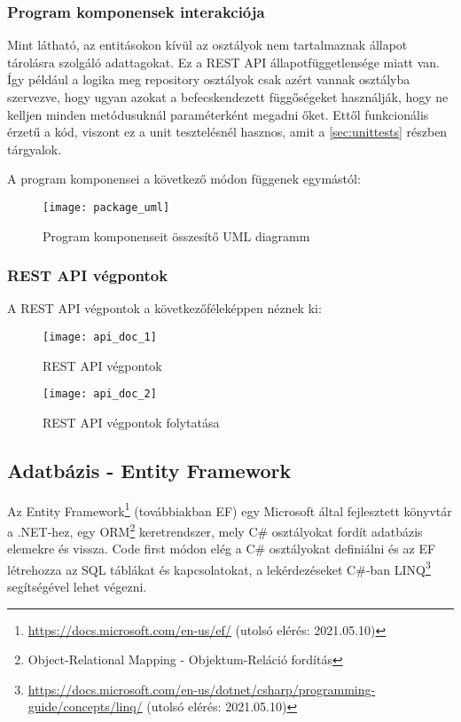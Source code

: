 \clearpage

\subsubsection{Program komponensek interakciója}

Mint látható, az entitásokon kívül az osztályok nem tartalmaznak állapot tárolásra szolgáló adattagokat. Ez a REST API állapotfüggetlensége miatt van. Így például a logika meg repository osztályok csak azért vannak osztályba szervezve, hogy ugyan azokat a befecskendezett függőségeket használják, hogy ne kelljen minden metódusuknál paraméterként megadni őket. Ettől funkcionális érzetű a kód, viszont ez a unit tesztelésnél hasznos, amit a \ref{sec:unittests} részben tárgyalok.

A program komponensei a következő módon függenek egymástól:

\begin{figure}[H]
	\centering
	\texttt{[image: package\_uml]}
	\caption{Program komponenseit összesítő UML diagramm}
	\label{fig:package}
\end{figure}

\clearpage

\subsubsection{REST API végpontok}

A REST API végpontok a következőféleképpen néznek ki:

\begin{figure}[H]
	\centering
	\texttt{[image: api\_doc\_1]}
	\caption{REST API végpontok}
	\label{fig:apiDoc1}
\end{figure}

\begin{figure}[H]
	\centering
	\texttt{[image: api\_doc\_2]}
	\caption{REST API végpontok folytatása}
	\label{fig:apiDoc2}
\end{figure}

\subsection{Adatbázis - Entity Framework}
Az Entity Framework\footnote{\url{https://docs.microsoft.com/en-us/ef/} (utolsó elérés: 2021.05.10)} (továbbiakban EF) egy Microsoft által fejlesztett könyvtár a .NET-hez, egy ORM\footnote{Object-Relational Mapping - Objektum-Reláció fordítás} keretrendszer, mely C\# osztályokat fordít adatbázis elemekre és vissza. Code first módon elég a C\# osztályokat definiálni és az EF létrehozza az SQL táblákat és kapcsolatokat, a lekérdezéseket C\#-ban LINQ\footnote{\url{https://docs.microsoft.com/en-us/dotnet/csharp/programming-guide/concepts/linq/} (utolsó elérés: 2021.05.10)} segítségével lehet végezni.

